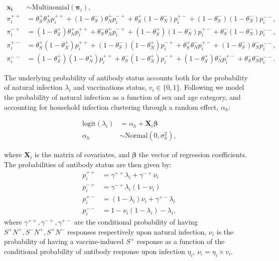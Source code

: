 \documentclass{article}
\begin{document}
\[
\begin{aligned}
\boldsymbol{x_i} & \sim \text{Multinomial}(\boldsymbol{\pi}_i), \\
\pi_i^{++} &= \theta^+_S \theta^+_N p_i^{++} + (1-\theta^-_S) \theta^+_N p_i^{-+} + \theta^+_S (1-\theta^-_N) p_i^{+-} + (1-\theta^-_S) (1-\theta^-_N) p_i^{--}, \\
\pi_i^{-+} &= (1-\theta^+_S) \theta^+_N p_i^{++} + \theta^-_S \theta^+_N p_i^{-+} + (1-\theta^+_S) (1-\theta^-_N) p_i^{+-} + \theta^-_S (1-\theta^-_N) p_i^{--}, \\
\pi_i^{+-} &= \theta^+_S (1-\theta^+_N) p_i^{++} + (1-\theta^-_S) (1-\theta^+_N) p_i^{-+} + \theta^+_S \theta^-_N p_i^{+-} + (1-\theta^-_S) \theta^-_N p_i^{--}, \\
\pi_i^{--} &= (1-\theta^+_S) (1-\theta^+_N) p_i^{++} + \theta^-_S (1-\theta^+_N) p_i^{-+} + (1-\theta^+_S) \theta^-_N p_i^{+-} + \theta^-_S \theta^-_N p_i^{--}.
\end{aligned}
\]

The underlying probability of antibody status accounts both for the
probability of natural infection $\lambda_i$ and vaccinations status,
$v_i \in \{0, 1\}$. Following \cite{stringhini2020lancet,stringhini2021_sp2} we model the
probability of natural infection as a function of sex and age category,
and accounting for household infection clustering through a random
effect, $\alpha_h$:

\[
\begin{aligned}
\text{logit}(\lambda_i) &= \alpha_h + \mathbf{X}_i \boldsymbol{\beta} \\
\alpha_h &\sim \text{Normal}(0, \sigma_h^2),
\end{aligned}
\]

where $\mathbf{X}_i$ is the matrix of covariates, and
$\boldsymbol{\beta}$ the vector of regression coefficients. The
probabilities of antibody status are then given by: \[
\begin{aligned}
p_i^{++} &= \gamma^{++}\lambda_i + \gamma^{-+}\nu_i \\
p_i^{-+} &= \gamma^{-+}\lambda_i(1-\nu_i) \\
p_i^{+-} &= (1-\lambda_i)\nu_i + \gamma^{+-}\lambda_i\\
p_i^{--} &= 1 - \nu_i (1-\lambda_i) - \lambda_i,
\end{aligned}
\] where $\gamma^{++}, \gamma^{-+}, \gamma^{+-}$ are the conditional
probability of having $S^+N^+, S^-N^+, S^+N^-$ responses respectively upon
natural infection, $\nu_i$ is the probability of having a
vaccine-induced $S^+$ response as a function of the conditional probability
of antibody response upon infection $\eta_i$,
$\nu_i = \eta_i \times v_i$.
\end{document}
